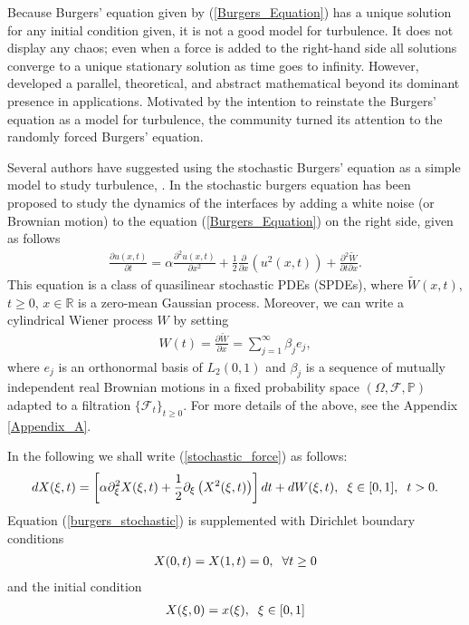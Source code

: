     Because Burgers' equation given by (\ref{Burgers_Equation}) has a unique solution for any initial condition given, it is not a good model for turbulence. It does not display any chaos; even when a force is added to the right-hand side all solutions converge to a unique stationary solution as time goes to infinity. However, developed a parallel, theoretical, and abstract mathematical beyond its dominant presence in applications. Motivated by the intention to reinstate the Burgers' equation as a model for turbulence, the community turned its attention to the randomly forced Burgers' equation.
    
    Several authors have suggested using the stochastic Burgers' equation as a simple model to study turbulence, \cite{Chambers1988,CHOI1992,DAH-TENC1969,HOSOKAWA1975}.
    In \cite{KARDAR1986} the stochastic burgers equation has been proposed to study the dynamics of the interfaces by adding a white noise (or Brownian motion) to the equation (\ref{Burgers_Equation}) on the right side, given as follows
    \begin{align}
    	\frac{\partial u(x, t)}{\partial t} = \alpha \frac{\partial^2 u(x, t)}{\partial x^2} + \frac{1}{2} \frac{\partial}{\partial x} (u^2 (x, t)) + \frac{\partial^2 \widetilde{W}}{\partial t \partial x}.
    	\label{stochastic_force} 
    \end{align}    
    This equation is a class of quasilinear stochastic PDEs (SPDEs), where $\widetilde{W} (x, t)$, $t \geq 0$, $x \in \mathbb{R}$ is a zero-mean Gaussian process. Moreover, we can write a cylindrical Wiener process $W$ by setting
    \begin{align*}
    	W(t) = \frac{\partial \widetilde{W}}{\partial x} = \displaystyle \sum_{j=1}^{\infty} \beta_j e_j,
    \end{align*}
    where ${e_j}$ is an orthonormal basis of $L_2 (0, 1)$ and ${\beta_j}$ is a sequence of mutually independent real Brownian motions in a fixed probability space $(\Omega, \mathcal{F}, \mathbb{P})$ adapted to a filtration $\{\mathcal{F}_t\}_{t \geq 0}$. For more details of the above, see the Appendix \ref{Appendix_A}.  
    
    \noindent In the following we shall write (\ref{stochastic_force}) as follows:
    \begin{align}
    	d X(\xi, t) = \left[ \alpha \partial_\xi^2 X(\xi, t) + \frac{1}{2} \partial_\xi \left(X^2 (\xi, t)\right) \right] dt + d W(\xi, t), \hspace{2mm} \xi \in [0, 1], \hspace{2mm} t > 0.
    	\label{burgers_stochastic}
    \end{align}
    Equation (\ref{burgers_stochastic}) is supplemented with Dirichlet boundary conditions
    \begin{align*}
    	X (0, t) = X (1, t) = 0, \hspace{2mm} \forall t \geq 0
    \end{align*}
    and the initial condition
    \begin{align*}
    	X(\xi, 0) = x(\xi), \hspace{2mm} \xi \in [0, 1] 
    \end{align*}
    
